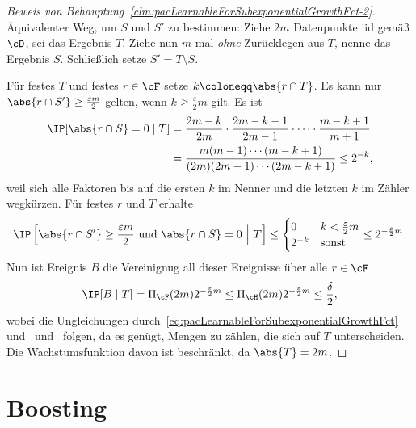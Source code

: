 \documentclass[language=ngerman,algolist,acrolist]{TemplateLecture}
\begin{document}
\begin{proof}[Beweis von Behauptung~\ref{clm:pacLearnableForSubexponentialGrowthFct-2}]
    Äquivalenter Weg, um $S$ und $S'$ zu bestimmen: Ziehe $2m$ Datenpunkte \ac{iid} gemäß $\cD$, sei das Ergebnis $T$. Ziehe nun $m$ mal \emph{ohne} Zurücklegen aus $T$, nenne das Ergebnis $S$. Schließlich setze $S' = T \setminus S$.

    Für festes $T$ und festes $r \in \cF$ setze $k \coloneqq \abs{r \cap T}$. Es kann nur $\abs{r \cap S'} \geq \frac{\varepsilon m}{2}$ gelten, wenn $k \geq \frac{\varepsilon}{2} m$ gilt. Es ist 
    \begin{equation*}
        \begin{split}
            \IP[\abs{r \cap S} = 0\mid T] &= \frac{2m-k}{2m} \cdot \frac{2m-k-1}{2m - 1} \cdot \cdots \cdot \frac{m - k + 1}{m + 1} \\
            &= \frac{m(m-1)\cdots(m-k+1)}{(2m)(2m-1)\cdots(2m-k+1)} \leq 2^{-k},
        \end{split}
    \end{equation*}
    weil sich alle Faktoren bis auf die ersten $k$ im Nenner und die letzten $k$ im Zähler wegkürzen. Für festes $r$ und $T$ erhalte 
    \begin{equation*}
        \IP\left[ \abs{r \cap S'} \geq \frac{\varepsilon m}{2} \text{ und } \abs{r \cap S} = 0 ~\middle|~ T \right] \leq \begin{cases}
            0 & k < \frac{\varepsilon}{2}m \\
            2^{-k} & \text{sonst}
        \end{cases} \leq 2^{-\frac{\varepsilon}{2}m}.
    \end{equation*}
    Nun ist Ereignis $B$ die Vereinignug all dieser Ereignisse über alle $r \in \cF$
    \begin{equation*}
        \IP[B \mid T] = \Pi_\cF(2m) 2^{-\frac{\varepsilon}{2}m} \leq \Pi_\cH(2m)2^{-\frac{\varepsilon}{2}m} \leq \frac{\delta}{2},
    \end{equation*}
    wobei die Ungleichungen durch~\eqref{eq:pacLearnableForSubexponentialGrowthFct} und~ und~ folgen, da es genügt, Mengen zu zählen, die sich auf $T$ unterscheiden. Die Wachstumsfunktion davon ist beschränkt, da $\abs{T} = 2m$.
\end{proof}


\chapter{Boosting}
\end{document}
